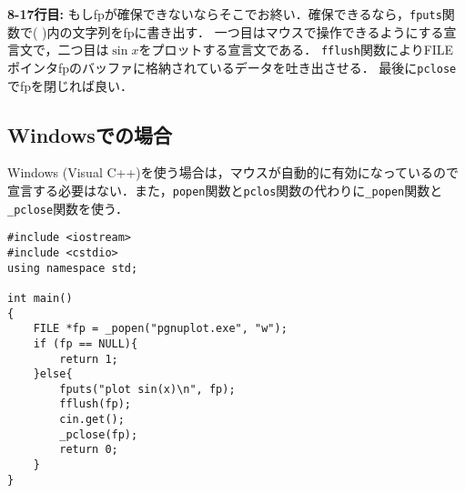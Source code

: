 \textbf{8-17行目:}
もしfpが確保できないならそこでお終い．確保できるなら，\texttt{fputs}関数で( )内の文字列をfpに書き出す．
一つ目はマウスで操作できるようにする宣言文で，二つ目は$\sin x$をプロットする宣言文である．
\texttt{fflush}関数によりFILEポインタfpのバッファに格納されているデータを吐き出させる．
最後に\texttt{pclose}でfpを閉じれば良い．


\subsection{ Windowsでの場合}
Windows (Visual C++)を使う場合は，マウスが自動的に有効になっているので宣言する必要はない．また，\texttt{popen}関数と\texttt{pclos}関数の代わりに\texttt{\_popen}関数と\texttt{\_pclose}関数を使う．
\begin{lstlisting}[caption=Visual C++のコード内からgnuplotを呼び出し$\sin x$を描く]
#include <iostream>
#include <cstdio>
using namespace std;

int main()
{
	FILE *fp = _popen("pgnuplot.exe", "w");
	if (fp == NULL){
		return 1;
	}else{
		fputs("plot sin(x)\n", fp);
		fflush(fp);
		cin.get();
		_pclose(fp);
		return 0;
	}
}
\end{lstlisting}
